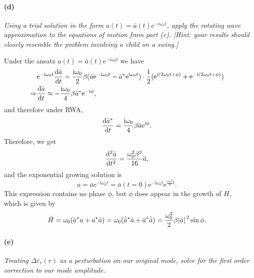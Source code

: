 \documentclass[hyperref, a4paper]{article}
\newcommand*{\ii}{\mathrm{i}}
\newcommand*{\ee}{\mathrm{e}}
\begin{document}
\paragraph*{(d)} \textit{Using a trial solution in the form $a(t)=\bar{a}(t) e^{-i \omega_o t}$, apply the rotating wave approximation to the equations of motion from part (c). [Hint: your results should closely resemble the problem involving a child on a swing.]} 

Under the ansatz $a(t) = \bar{a}(t) \ee^{- \ii \omega_0 t}$ we have 
\begin{equation}
    \begin{aligned}
        & \ee^{- \ii \omega_0 t} \dv{\bar{a}}{t} = \frac{\ii \omega_0}{2} \beta (\bar{a} \ee^{- \ii \omega_0 t} - \bar{a}^* \ee^{\ii \omega_0 t}) 
        \cdot \frac{1}{2} (\ee^{\ii (2 \omega_0 t + \phi)} + \ee^{- \ii (2 \omega_0 t + \phi)}) \\
        \Rightarrow & \dv{\bar{a}}{t} \approx  - \frac{\ii \omega_0}{4} \beta \bar{a}^* \ee^{- \ii \phi},
    \end{aligned}
\end{equation}
and therefore under RWA, 
\begin{equation}
    \dv{\bar{a}^*}{t} = \frac{\ii \omega_0}{4} \beta \bar{a} \ee^{\ii \phi}.
\end{equation}
Therefore, we get 
\begin{equation}
    \dv[2]{\bar{a}}{t} = \frac{\omega_0^2 \beta^2}{16} \bar{a},   
\end{equation}
and the exponential growing solution is 
\begin{equation}
    a = \bar{a} \ee^{- \ii \omega_0 t} = \bar{a}(t=0) \ee^{- \ii \omega_0 t} \ee^{\frac{\omega_0 \beta}{4} t}.
\end{equation}
This expression contains no phase $\phi$, but $\phi$ does appear in the growth of $H$, which is given by 
\begin{equation}
    \dot{H} = \omega_0 (\dot{{a}}^* a + a^* \dot{a})
    = \omega_0 (\dot{\bar{a}}^* \bar{a} + \bar{a}^* \dot{\bar{a}})
    = \frac{\omega_0^2}{2} \beta \abs*{\bar{a}}^2 \sin \phi.
\end{equation}

\paragraph*{(e)} \textit{Treating $\Delta \varepsilon_r(r)$ as a perturbation on our original mode, solve for the first order correction to our mode amplitude.} 
\end{document}
